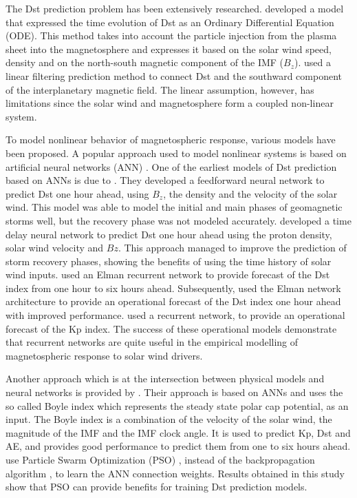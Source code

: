 The Dst prediction problem has been extensively researched. \citet{JGR:JGR10260} developed a model 
that expressed the time evolution of Dst as an Ordinary Differential Equation (ODE). This method takes into account 
the particle injection from the plasma sheet into the magnetosphere and expresses it based on the solar wind speed, 
density and on the north-south magnetic component of the IMF ($B_z$). \citet{Iyemori1979} used a linear filtering 
prediction method to connect Dst and the southward component of the interplanetary magnetic field. The linear 
assumption, however, has limitations since  the solar wind and magnetosphere form a coupled non-linear system. 

To model nonlinear behavior of magnetospheric response, various models have been proposed. A popular approach 
used to model nonlinear systems is based on artificial neural networks (ANN) \citep{haykin1994neural}. One of the 
earliest models of Dst prediction based on ANNs is due to \citet{lundstedt1994prediction}. They developed 
a feedforward neural network to predict Dst one hour ahead, using $B_z$, the density and the velocity of 
the solar wind. This model was able to model the initial and main phases of geomagnetic storms well, but 
the recovery phase was not modeled accurately. \citet{gleisner1996predicting} developed a time delay 
neural network \citep{Waibel1989} to predict Dst one hour ahead using the proton density, solar wind 
velocity and $Bz$. This approach managed to improve the prediction of storm recovery phases, showing 
the benefits of using the time history of solar wind inputs. \citet{wu1997geomagnetic} used an Elman 
recurrent network \citep{elman} to provide forecast of the Dst index from one hour to six hours ahead. 
Subsequently, \citet{Lund} used the Elman network architecture to provide an operational forecast of 
the Dst index one hour ahead with improved performance. \citet{JGRA:JGRA17461} used a recurrent network, 
to provide an operational forecast of the Kp index. The success of these operational models demonstrate that 
recurrent networks are quite useful in the empirical modelling of magnetospheric response to solar wind drivers. 

Another approach which is at the intersection between physical models and neural networks is provided by 
\citet{Bala2012}. Their approach is based on ANNs and uses the so called Boyle index which represents 
the steady state polar cap potential, as an input. The Boyle index is a combination of the velocity of 
the solar wind, the magnitude of the IMF and the IMF clock angle. It is used to predict Kp, Dst and AE, 
and provides good performance to predict them from one to six hours ahead. \citet{Lazzus} use 
Particle Swarm Optimization (PSO) \citep{eberhart1995new}, instead of the backpropagation algorithm 
\citep{rummelhart1986parallel}, to learn the ANN connection weights. Results obtained in this study show 
that PSO can provide benefits for training Dst prediction models.

